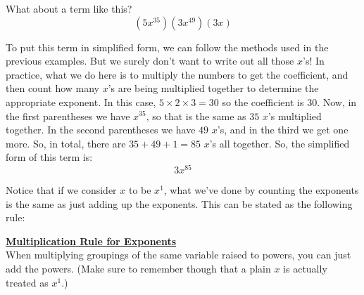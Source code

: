 

What about a term like this?
$$(5x^{35})(3x^{49})(3x)$$

To put this term in simplified form, we can follow the methods used in the previous examples. But we surely don’t want to write out all those $x$’s! In practice, what we do here is to multiply the numbers to get the coefficient, and then count how many $x$’s are being multiplied together to determine the appropriate exponent.  In this case, $5 \times 2 \times 3 = 30$ so the coefficient is $30$. Now, in the first parentheses we have $x^{35}$, so that is the same as $35$ $x$’s multiplied together. In the second parentheses we have $49$ $x$’s, and in the third we get one more. So, in total, there are $35+49+1=85$ $x$’s all together. So, the simplified form of this term is:
$$3x^{85}$$

Notice that if we consider $x$ to be $x^1$, what we’ve done by counting the exponents is the same as just adding up the exponents. This can be stated as the following rule:

%
%

\begin{definition}
	\textbf{\underline{Multiplication Rule for Exponents}}\\
	\bigskip
	When multiplying groupings of the same variable raised to powers, you can just add the powers.  (Make sure to remember though that a plain $x$ is actually treated as $x^1$.)
\end{definition}




